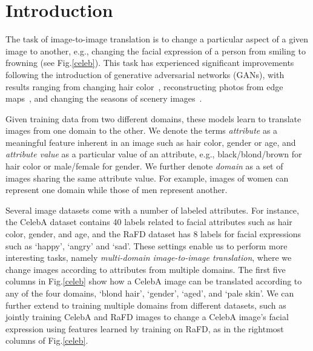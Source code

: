 \documentclass[10pt,twocolumn,letterpaper]{article}
\begin{document}
\vspace{-.2in}
\section{Introduction}

The task of image-to-image translation is to change a particular aspect of a given image to another, e.g., changing the facial expression of a person from smiling to frowning (see Fig.\thinspace\ref{celeb}). This task has experienced significant improvements following the introduction of generative adversarial networks (GANs), with results ranging from changing hair color~\cite{kim2017learning}, reconstructing photos from edge maps~\cite{Isola_2017_CVPR}, and changing the seasons of scenery images~\cite{zhu2017unpaired}. 

Given training data from two different domains, these models learn to translate images from one domain to the other. We denote the terms \textit{attribute} as a meaningful feature inherent in an image such as hair color, gender or age, and \textit{attribute value} as a particular value of an attribute, e.g., black/blond/brown for hair color or male/female for gender. We further denote \textit{domain} as a set of images sharing the same attribute value. For example, images of women can represent one domain while those of men represent another. 

Several image datasets come with a number of labeled attributes. For instance, the CelebA\cite{liu2015faceattributes} dataset contains 40 labels related to facial attributes such as hair color, gender, and age, and the RaFD \cite{langner2010presentation} dataset has 8 labels for facial expressions such as `happy', `angry' and `sad'. These settings enable us to perform more interesting tasks, namely \textit{multi-domain image-to-image translation}, where we change images according to attributes from multiple domains. The first five columns in Fig.\thinspace\ref{celeb} show how a CelebA image can be translated according to any of the four domains, `blond hair', `gender', `aged', and `pale skin'. We can further extend to training multiple domains from different datasets, such as jointly training CelebA and RaFD images to change a CelebA image's facial expression using features learned by training on RaFD, as in the rightmost columns of Fig.\thinspace\ref{celeb}. 
\end{document}
